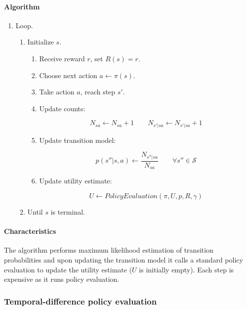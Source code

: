 			\paragraph{Algorithm}

			\begin{enumerate}
				\item Loop.

					\begin{enumerate}
						\item Initialize $s$.

							\begin{enumerate}
								\item Receive reward $r$, set $R(s) = r$.
								\item Choose next action $a\leftarrow\pi(s)$.
								\item Take action $a$, reach step $s'$.
								\item Update counts:

									$$N_{sa}\leftarrow N_{sa} + 1\qquad N_{s'|sa}\leftarrow N_{s'|sa}+1$$

								\item Update transition model:

									$$p(s''|s,a)\leftarrow \frac{N_{s''|sa}}{N_{sa}}\qquad\forall s''\in\mathcal{S}$$

								\item Update utility estimate:

									$$U\leftarrow PolicyEvaluation(\pi, U, p, R, \gamma)$$

							\end{enumerate}

						\item Until $s$ is terminal.
					\end{enumerate}
			\end{enumerate}

			\paragraph{Characteristics}
			The algorithm performs maximum likelihood estimation of transition probabilities and upon updating the transition model it calls a standard policy evaluation to update the utility estimate ($U$ is initially empty).
			Each step is expensive as it runs policy evaluation.

		\subsubsection{Temporal-difference policy evaluation}

